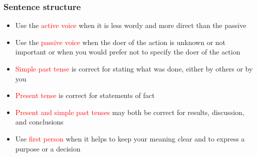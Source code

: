 \documentclass[newPxFont,sthlmFooter]{beamer}
\newcommand{\fs}{\footnotesize}
\begin{document}
{
\begin{frame}\frametitle{Sentence structure}
  \begin{itemize}
  \fs
  \item Use the \textcolor{red}{active voice} when it is less wordy and more direct than the passive
  \item Use the \textcolor{red}{passive voice} when the doer of the action is unknown or not important or when you would prefer not to specify the doer of the action
  \item \textcolor{red}{Simple past tense} is correct for stating what was done, either by others or by you
  \item \textcolor{red}{Present tense} is correct for statements of fact
  \item \textcolor{red}{Present and simple past tenses} may both be correct for results, discussion, and conclusions
  \item Use \textcolor{red}{first person} when it helps to keep your meaning clear and to express a purpose or a decision
  \end{itemize}
\end{frame}}
\end{document}

